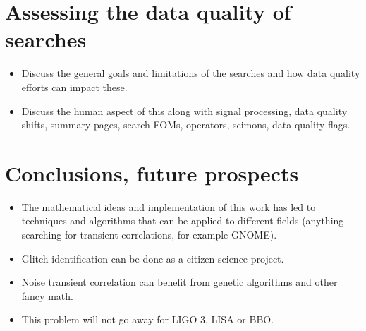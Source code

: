 \section{Assessing the data quality of searches}\label{ch15:assessing}

\begin{itemize}
\item Discuss the general goals and limitations of the searches and how data quality efforts can impact these.
\item Discuss the human aspect of this along with signal processing, data quality shifts, summary pages, search FOMs, operators, scimons, data quality flags. 
\end{itemize}

\section{Conclusions, future prospects}\label{ch15:conclusions}

\begin{itemize}
\item The mathematical ideas and implementation of this work has led to techniques and algorithms that can be applied to different fields (anything searching for transient correlations, for example GNOME). 
\item Glitch identification can be done as a citizen science project. 
\item Noise transient correlation can benefit from genetic algorithms and other fancy math. 
\item This problem will not go away for LIGO 3, LISA or BBO. 
\end{itemize}